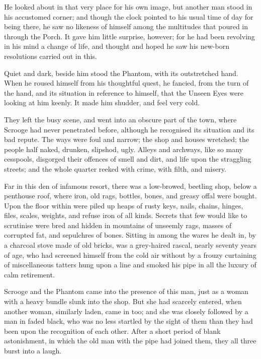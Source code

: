 He looked about in that very place for his own image, but another man stood in his accustomed corner; and though the clock pointed to his usual time of day for being there, he saw no likeness of himself among the multitudes that poured in through the Porch. It gave him little surprise, however; for he had been revolving in his mind a change of life, and thought and hoped he saw his new-born resolutions carried out in this.

Quiet and dark, beside him stood the Phantom, with its out\-stretched hand. When he roused himself from his thoughtful quest, he fancied, from the turn of the hand, and its situation in reference to himself, that the Unseen Eyes were looking at him keenly. It made him shudder, and feel very cold.

They left the busy scene, and went into an obscure part of the town, where Scrooge had never penetrated before, although he recognised its situation and its bad repute. The ways were foul and narrow; the shop and houses wretched; the people half naked, drunken, slipshod, ugly. Alleys and archways, like so many cesspools, disgorged their offences of smell and dirt, and life upon the straggling streets; and the whole quarter reeked with crime, with filth, and misery.

Far in this den of infamous resort, there was a low-browed, beetling shop, below a penthouse roof, where iron, old rags, bottles, bones, and greasy offal were bought. Upon the floor within were piled up heaps of rusty keys, nails, chains, hinges, files, scales, weights, and refuse iron of all kinds. Secrets that few would like to scrutinise were bred and hidden in mountains of unseemly rags, masses of corrupted fat, and sepulchres of bones. Sitting in among the wares he dealt in, by a charcoal stove made of old bricks, was a grey-haired rascal, nearly seventy years of age, who had screened himself from the cold air without by a frouzy curtaining of miscellaneous tatters hung upon a line and smoked his pipe in all the luxury of calm retirement.

Scrooge and the Phantom came into the presence of this man, just as a woman with a heavy bundle slunk into the shop. But she had scarcely entered, when another woman, similarly laden, came in too; and she was closely followed by a man in faded black, who was no less startled by the sight of them than they had been upon the recognition of each other. After a short period of blank astonishment, in which the old man with the pipe had joined them, they all three burst into a laugh.

